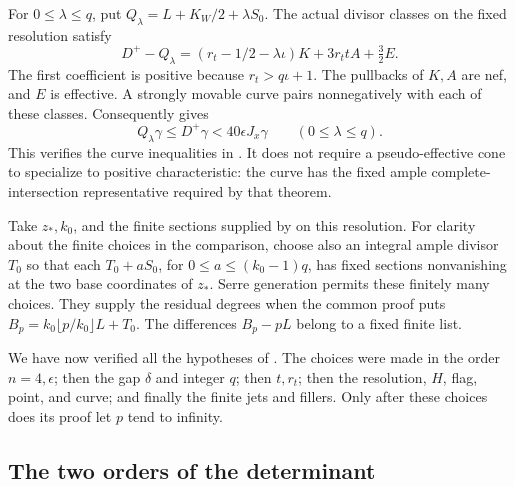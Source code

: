 For $0\le\lambda\le q$, put $Q_\lambda=L+K_W/2+\lambda S_0$.
The actual divisor classes on the fixed resolution satisfy
\begin{equation}\label{eq:slot-domination}
 D^+-Q_\lambda
 =(r_t-1/2-\lambda\iota)K+3r_ttA+\tfrac32E.
\end{equation}
The first coefficient is positive because $r_t>q\iota+1$.
The pullbacks of $K,A$ are nef, and $E$ is effective. A strongly
movable curve pairs nonnegatively with each of these classes.
Consequently  gives
\[
 Q_\lambda\gamma\le D^+\gamma
 <40\epsilon J_x\gamma\qquad(0\le\lambda\le q).
\]
This verifies the curve inequalities in .
It does not require a pseudo-effective cone to specialize to
positive characteristic: the curve has the fixed ample
complete-intersection representative required by that theorem.

Take $z_*,k_0$, and the finite sections supplied by
 on this resolution. For clarity about
the finite choices in the comparison, choose also an integral ample
divisor $T_0$ so that each $T_0+aS_0$, for
$0\le a\le(k_0-1)q$, has fixed sections nonvanishing at the two
base coordinates of $z_*$. Serre generation permits these finitely
many choices. They supply the residual degrees when the common
proof puts $B_p=k_0\lfloor p/k_0\rfloor L+T_0$. The differences
$B_p-pL$ belong to a fixed finite list.

We have now verified all the hypotheses of .
The choices were made in the order $n=4,\epsilon$; then the gap
$\delta$ and integer $q$; then $t,r_t$; then the resolution,
$H$, flag, point, and curve; and finally the finite jets and fillers.
Only after these choices does its proof let $p$ tend to infinity.

\subsection{The two orders of the determinant}

